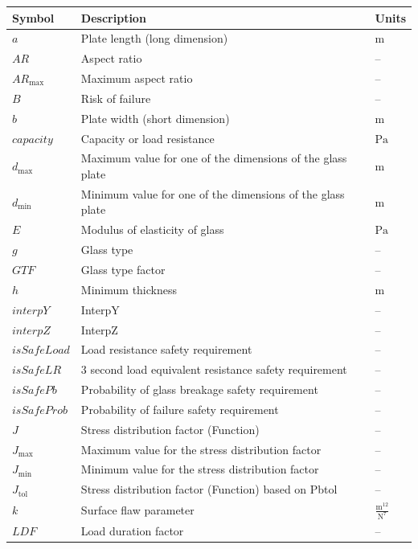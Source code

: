 \documentclass[12pt]{article}
\begin{document}
\begin{longtabu}{l X[l] l}
\toprule
\textbf{Symbol} & \textbf{Description} & \textbf{Units}
\\
\midrule
\endhead
$a$ & Plate length (long dimension) & ${\text{m}}$
\\
$\mathit{AR}$ & Aspect ratio & --
\\
${\mathit{AR}_{\text{max}}}$ & Maximum aspect ratio & --
\\
$B$ & Risk of failure & --
\\
$b$ & Plate width (short dimension) & ${\text{m}}$
\\
$\mathit{capacity}$ & Capacity or load resistance & ${\text{Pa}}$
\\
${d_{\text{max}}}$ & Maximum value for one of the dimensions of the glass plate & ${\text{m}}$
\\
${d_{\text{min}}}$ & Minimum value for one of the dimensions of the glass plate & ${\text{m}}$
\\
$E$ & Modulus of elasticity of glass & ${\text{Pa}}$
\\
$g$ & Glass type & --
\\
$\mathit{GTF}$ & Glass type factor & --
\\
$h$ & Minimum thickness & ${\text{m}}$
\\
$\mathit{interpY}$ & InterpY & --
\\
$\mathit{interpZ}$ & InterpZ & --
\\
$\mathit{isSafeLoad}$ & Load resistance safety requirement & --
\\
$\mathit{isSafeLR}$ & 3 second load equivalent resistance safety requirement & --
\\
$\mathit{isSafePb}$ & Probability of glass breakage safety requirement & --
\\
$\mathit{isSafeProb}$ & Probability of failure safety requirement & --
\\
$J$ & Stress distribution factor (Function) & --
\\
${J_{\text{max}}}$ & Maximum value for the stress distribution factor & --
\\
${J_{\text{min}}}$ & Minimum value for the stress distribution factor & --
\\
${J_{\text{tol}}}$ & Stress distribution factor (Function) based on Pbtol & --
\\
$k$ & Surface flaw parameter & $\frac{\text{m}^{12}}{\text{N}^{7}}$
\\
$\mathit{LDF}$ & Load duration factor & --
\\

\end{longtabu}
\end{document}
